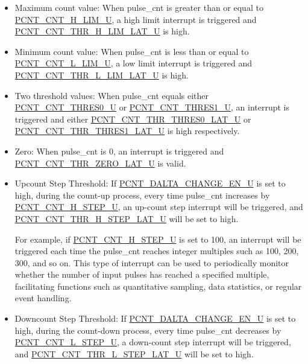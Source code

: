 \documentclass[main\_\_EN.tex]{subfiles}
\begin{document}
\begin{itemize}
    \item Maximum count value: When pulse\_cnt is greater than or equal to \hyperref[fielddesc:PCNTCNTHLIMUN]{PCNT\_CNT\_H\_LIM\_U}, a high limit interrupt is triggered and \hyperref[fielddesc:PCNTCNTTHRHLIMLATUN]{PCNT\_CNT\_THR\_H\_LIM\_LAT\_U} is high.
    \item Minimum count value: When pulse\_cnt is less than or equal to \hyperref[fielddesc:PCNTCNTLLIMUN]{PCNT\_CNT\_L\_LIM\_U}, a low limit interrupt is triggered and \hyperref[fielddesc:PCNTCNTTHRLLIMLATUN]{PCNT\_CNT\_THR\_L\_LIM\_LAT\_U} is high.
    \item Two threshold values: When pulse\_cnt equals either \hyperref[fielddesc:PCNTCNTTHRES0UN]{PCNT\_CNT\_THRES0\_U} or \hyperref[fielddesc:PCNTCNTTHRES1UN]{PCNT\_CNT\_THRES1\_U}, an interrupt is triggered and either \hyperref[fielddesc:PCNTCNTTHRTHRES0LATUN]{PCNT\_CNT\_THR\_THRES0\_LAT\_U} or \hyperref[fielddesc:PCNTCNTTHRTHRES1LATUN]{PCNT\_CNT\_THR\_THRES1\_LAT\_U} is high respectively.
    \item Zero: When pulse\_cnt is 0, an interrupt is triggered and \hyperref[fielddesc:PCNTCNTTHRZEROLATUN]{PCNT\_CNT\_THR\_ZERO\_LAT\_U} is valid.
    \item Upcount Step Threshold: If \hyperref[fielddesc:PCNTDALTACHANGEENUN]{PCNT\_DALTA\_CHANGE\_EN\_U} is set to high, during the count-up process, every time pulse\_cnt increases by \hyperref[fielddesc:PCNTCNTHSTEPUN]{PCNT\_CNT\_H\_STEP\_U}, an up-count step interrupt will be triggered, and \hyperref[fielddesc:PCNTCNTTHRHSTEPLATUN]{PCNT\_CNT\_THR\_H\_STEP\_LAT\_U} will be set to high.

    For example, if \hyperref[fielddesc:PCNTCNTHSTEPUN]{PCNT\_CNT\_H\_STEP\_U} is set to 100, an interrupt will be triggered each time the pulse\_cnt reaches integer multiples such as 100, 200, 300, and so on. This type of interrupt can be used to periodically monitor whether the number of input pulses has reached a specified multiple, facilitating functions such as quantitative sampling, data statistics, or regular event handling.

    \item Downcount Step Threshold: If \hyperref[fielddesc:PCNTDALTACHANGEENUN]{PCNT\_DALTA\_CHANGE\_EN\_U} is set to high, during the count-down process, every time pulse\_cnt decreases by \hyperref[fielddesc:PCNTCNTLSTEPUN]{PCNT\_CNT\_L\_STEP\_U}, a down-count step interrupt will be triggered, and \hyperref[fielddesc:PCNTCNTTHRLSTEPLATUN]{PCNT\_CNT\_THR\_L\_STEP\_LAT\_U} will be set to high.


\end{itemize}
\end{document}
